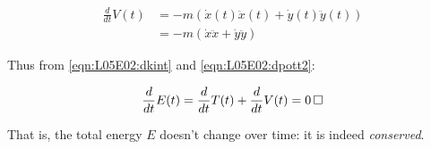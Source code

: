 \documentclass[solutions.tex]{subfiles}
\begin{document}
\begin{equation}
	\label{eqn:L05E02:dpott2}
	\begin{aligned}
		\frac{d}{dt}V(t) &= -m(\dot{x}(t)\ddot{x}(t)+\dot{y}(t)\ddot{y}(t))\\
		~ &= -m(\dot{x}\ddot{x}+\dot{y}\ddot{y})
	\end{aligned}
\end{equation}

Thus from \eqref{eqn:L05E02:dkint} and \eqref{eqn:L05E02:dpott2}:

\begin{equation}
	\frac{d}{dt}E(t) = \frac{d}{dt}T(t) + \frac{d}{dt}V(t) = 0 \qed
\end{equation}

That is, the total energy $E$ doesn't change over time: it is indeed
\textit{conserved}.
\end{document}
